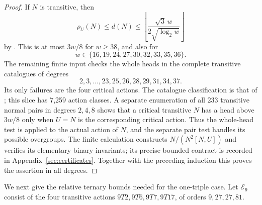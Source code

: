 \begin{proof}
If $N$ is transitive, then
\[
 \rho_U(N)\leq d(N)\leq
 \left\lfloor\frac{\sqrt3\,w}{2\sqrt{\log_2w}}\right\rfloor
\]
by \cite[Theorem~1.1]{Tracey2021Sharp}. This is at most $3w/8$ for
$w\geq38$, and also for
\[w\in\{16,19,24,27,30,32,33,35,36\}.\]
The remaining finite input checks the whole heads in the complete
transitive catalogues of degrees
\[
 2,3,\ldots,23,25,26,28,29,31,34,37.
\]
Its only failures are the four critical actions. The catalogue
classification is that of \cite{HoltRoyle2020,TransGrp365}; this slice
has 7,259 action classes. A separate enumeration of all 233 transitive
normal pairs in degrees $2,4,8$ shows that a critical transitive $N$
has a head above $3w/8$ only when $U=N$ is the corresponding critical
action. Thus the whole-head test is applied to the actual action of
$N$, and the separate pair test handles its possible overgroups.
The finite calculation constructs $N/(N^2[N,U])$ and verifies its
elementary binary invariants; its precise bounded contract is recorded
in Appendix~\ref{sec:certificates}. Together with the preceding
induction this proves the assertion in all degrees.
\end{proof}

We next give the relative ternary bounds needed for the one-triple
case. Let $\mathcal E_9$ consist of the four transitive actions
$9T2,9T6,9T7,9T17$, of orders $9,27,27,81$.

